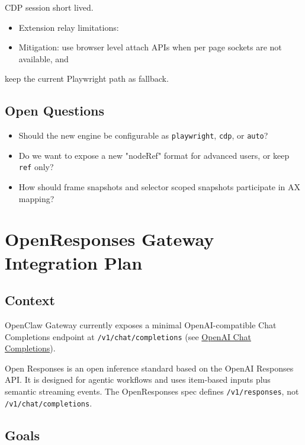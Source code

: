 CDP session short lived.
\begin{itemize}
  \item Extension relay limitations:
  \item Mitigation: use browser level attach APIs when per page sockets are not available, and
\end{itemize}

keep the current Playwright path as fallback.

\subsection{Open Questions}


\begin{itemize}
  \item Should the new engine be configurable as \texttt{playwright}, \texttt{cdp}, or \texttt{auto}?
  \item Do we want to expose a new "nodeRef" format for advanced users, or keep \texttt{ref} only?
  \item How should frame snapshots and selector scoped snapshots participate in AX mapping?
\end{itemize}



\clearpage

\section{OpenResponses Gateway Integration Plan}


\subsection{Context}


OpenClaw Gateway currently exposes a minimal OpenAI-compatible Chat Completions endpoint at
\texttt{/v1/chat/completions} (see \href{/gateway/openai-http-api}{OpenAI Chat Completions}).

Open Responses is an open inference standard based on the OpenAI Responses API. It is designed
for agentic workflows and uses item-based inputs plus semantic streaming events. The OpenResponses
spec defines \texttt{/v1/responses}, not \texttt{/v1/chat/completions}.

\subsection{Goals}


